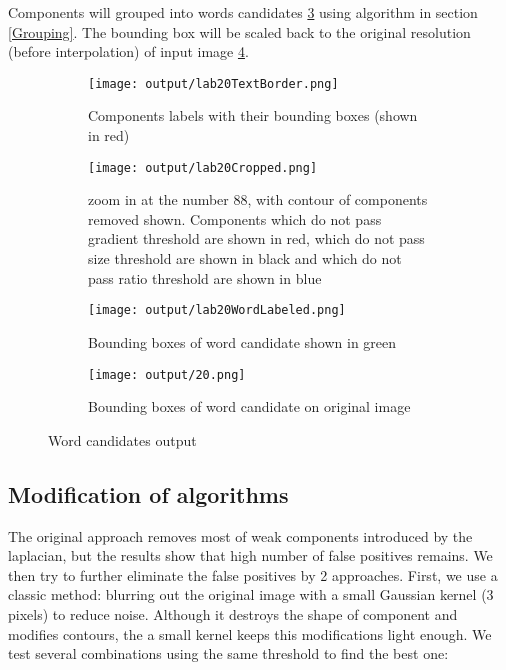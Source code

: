 Components will grouped into words candidates \ref{fig:BoundingBoxOfWordCandidateOnLabel} using algorithm in section \ref{Grouping}. The bounding box will be scaled back to the original resolution (before interpolation) of input image \ref{fig:BoundingBoxOfWordCandidate}.


\begin{figure}

	\begin{subfigure}[t]{0.45\textwidth}
	\captionsetup{width=0.85\textwidth} 
		\texttt{[image: output/lab20TextBorder.png]}  \caption{Components labels with their bounding boxes (shown in red)}\label{fig:BoundingBoxOfCharacter} \end{subfigure}	
	\begin{subfigure}[t]{0.45\textwidth} 
	\captionsetup{width=0.80\textwidth} 
	\texttt{[image: output/lab20Cropped.png]}  
	\caption{zoom in at the number 88, with contour of components removed shown. Components which do not pass gradient threshold are shown in red, which do not pass size threshold are shown in black and which do not pass ratio threshold are shown in blue}\label{fig:labeling_contour} \end{subfigure}	
\centering	


	\begin{subfigure}[b]{0.45\textwidth}
	\captionsetup{width=0.85\textwidth} 
		\texttt{[image: output/lab20WordLabeled.png]}  \caption{Bounding boxes of word candidate shown in green}\label{fig:BoundingBoxOfWordCandidateOnLabel} \end{subfigure}
	\begin{subfigure}[b]{0.45\textwidth}
	\captionsetup{width=0.85\textwidth}
		\texttt{[image: output/20.png]}  \caption{Bounding boxes of word candidate on original image}\label{fig:BoundingBoxOfWordCandidate} \end{subfigure}			
\centering	
		
	\caption[Word candidates output] {Word candidates output}
	\label{fig:Wordcandidatesoutput}
\end{figure}
\subsection{Modification of algorithms}
The original approach removes most of weak components introduced by the laplacian, but the results show that high number of false positives remains. We then try to further eliminate the false positives by 2 approaches. First, we use a classic method: blurring out the original image with a small Gaussian kernel (3 pixels) to reduce noise. Although it destroys the shape of component and modifies contours, the a small kernel keeps this modifications light enough. We test several combinations using the same threshold to find the best one:

